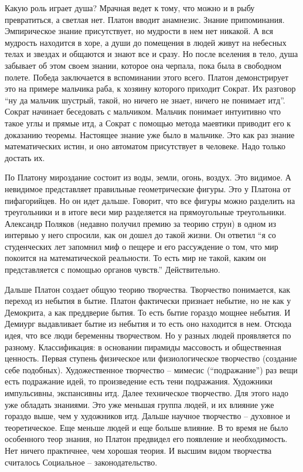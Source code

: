 \documentclass[a4paper, 12pt]{article}
\begin{document}
Какую роль играет душа? Мрачная ведет к тому, что можно и в рыбу превратиться, а светлая нет. Платон вводит анамнезис. Знание припоминания. Эмпирическое знание присутствует, но мудрости в нем нет никакой. А вся мудрость находится в хоре, а души до помещения в людей живут на небесных телах и звездах и общаются и знают все и сразу. Но после вселения в тело, душа забывает об этом своем знании, которое она черпала, пока была в свободном полете. Победа заключается в вспоминании этого всего. Платон демонстрирует это на примере мальчика раба, к хозяину которого приходит Сократ. Их разговор ``ну да мальчик шустрый, такой, но ничего не знает, ничего не понимает итд''. Сократ начинает беседовать с мальчиком. Мальчик понимает интуитивно что такое углы и прямые итд, а Сократ с помощью метода маевтики приводит его к доказанию теоремы. Настоящее знание уже было в мальчике. Это как раз знание математических истин, и оно автоматом присутствует в человеке. Надо только достать их. 

По Платону мироздание состоит из воды, земли, огонь, воздух. Это видимое. А невидимое представляет правильные геометрические фигуры. Это у Платона от пифагорийцев. Но он идет дальше. Говорит, что все фигуры можно разделить на треугольники и в итоге веси мир разделяется на прямоугольные треугольники. Александр Поляков (недавно получил премию за теорию струн) в одном из интервью у него спросили, как он дошел до такой жизни. Он ответил ``я со студенческих лет запомнил миф о пещере и его рассуждение о том, что мир покоится на математической реальности. То есть мир не такой, каким он представляется с помощью органов чувств.'' Действительно. 

Дальше Платон создает общую теорию творчества. Творчество понимается, как переход из небытия в бытие. Платон фактически признает небытие, но не как у Демокрита, а как преддверие бытия. То есть бытие гораздо мощнее небытия. И Демиург выдавливает бытие из небытия и то есть оно находится в нем. Отсюда идея, что все люди беременны творчеством. Но у разных людей проявляется по разному. Классификация: в основании пирамиды массовость и общественная ценность. Первая ступень физическое или физиологическое творчество (создание себе подобных). Художественное творчество -- мимесис (``подражание'') раз вещи есть подражание идей, то произведение есть тени подражания. Художники импульсивны, экспансивны итд. Далее техническое творчество. Для этого надо уже обладать знаниями. Это уже меньшая группа людей, и их влияние уже гораздо выше, чем у художников итд. Дальше научное творчество -- духовное и теоретическое. Еще меньше людей и еще больше влияние. В то время не было особенного теор знания, но Платон предвидел его появление и необходимость. Нет ничего практичнее, чем хорошая теория. И высшим видом творчества считалось Социальное -- законодательство. 
\end{document}

